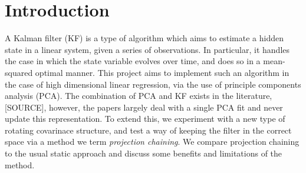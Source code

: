 \section{Introduction}
A Kalman filter (KF) is a type of algorithm which aims to estimate a hidden state in a linear system, given a series of observations. In particular, it handles the case in which the state variable evolves over time, and does so in a mean-squared optimal manner. This project aims to implement such an algorithm in the case of high dimensional linear regression, via the use of principle components analysis (PCA). The combination of PCA and KF exists in the literature, [SOURCE], however, the papers largely deal with a single PCA fit and never update this representation. To extend this, we experiment with a new type of rotating covarinace structure, and test a way of keeping the filter in the correct space via a method we term \textit{projection chaining}. We compare projection chaining to the usual static approach and discuss some benefits and limitations of the method.
